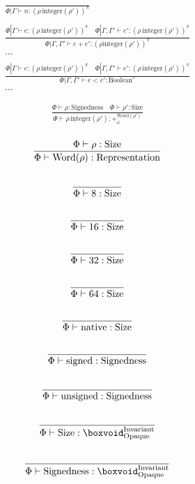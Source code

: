 \documentclass {article}
\begin{document}
\begin{gather*}
\frac
{}
{\Phi | \Gamma \vdash n : (\rho \, \text{integer}(\rho'))^\pi} \\
\\
\frac
{\Phi | \Gamma \vdash e : (\rho \, \text{integer}(\rho'))^\pi \quad \Phi | \Gamma, \Gamma' \vdash e' : (\rho \, \text{integer}(\rho'))^\pi}
{\Phi | \Gamma, \Gamma' \vdash e + e' : (\rho \text{integer}(\rho'))^\pi} \\
\dots \\
\\
\frac
{\Phi | \Gamma \vdash e : (\rho \, \text{integer}(\rho'))^\pi \quad \Phi | \Gamma, \Gamma' \vdash e' : (\rho \, \text{integer}(\rho'))^\pi}
{\Phi | \Gamma, \Gamma' \vdash e < e' : \text{Boolean}^\pi} \\
\dots
\end{gather*}

\begin{gather*}
\frac
{\Phi \vdash \rho : \text{Signedness} \quad \Phi \vdash \rho' : \text{Size}}
{\Phi \vdash \rho \, \text{integer}(\rho') : +^ {\text{Word} (\rho')}_\omega } \\
\end{gather*}

\begin{gather*}
\frac
{\Phi \vdash \rho : \text{Size}}
{\Phi \vdash \text{Word} (\rho) : \text{Representation}} \\
\\
\frac
{}
{\Phi \vdash 8 : \text{Size}} \\
\\
\frac
{}
{\Phi \vdash 16 : \text{Size}} \\
\\
\frac
{}
{\Phi \vdash 32 : \text{Size}} \\
\\
\frac
{}
{\Phi \vdash 64 : \text{Size}} \\
\\
\frac
{}
{\Phi \vdash \text{native} : \text{Size}} \\
\\
\frac
{}
{\Phi \vdash \text{signed} : \text{Signedness}} \\
\\
\frac
{}
{\Phi \vdash \text{unsigned} : \text{Signedness}} \\
\\
\frac
{}
{\Phi \vdash \text{Size} : \boxvoid^\text{Invariant}_\text{Opaque}} \\
\\
\frac
{}
{\Phi \vdash \text{Signedness} : \boxvoid^\text{Invariant}_\text{Opaque}}
\end{gather*}
\end{document}
